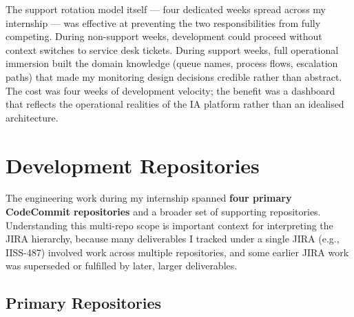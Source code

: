 The support rotation model itself --- four dedicated weeks spread across my
internship --- was effective at preventing the two responsibilities from fully
competing. During non-support weeks, development could proceed without context
switches to service desk tickets. During support weeks, full operational
immersion built the domain knowledge (queue names, process flows, escalation
paths) that made my monitoring design decisions credible rather than abstract.
The cost was four weeks of development velocity; the benefit was a dashboard
that reflects the operational realities of the IA platform rather than an
idealised architecture.

\section{Development Repositories}
\label{sec:dev_repositories}

The engineering work during my internship spanned \textbf{four primary
CodeCommit repositories} and a broader set of supporting repositories.
Understanding this multi-repo scope is important context for interpreting
the JIRA hierarchy, because many deliverables I tracked under a
single JIRA (e.g., IISS-487) involved work across multiple repositories, and
some earlier JIRA work was superseded or fulfilled by later, larger
deliverables.

\subsection{Primary Repositories}


